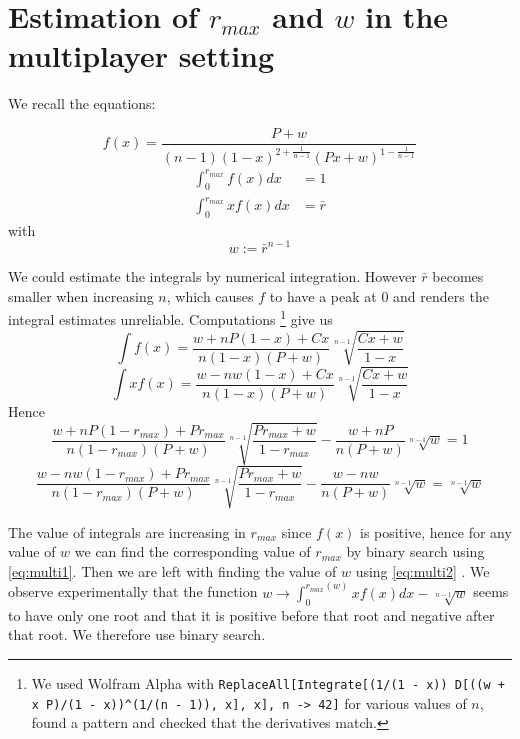 \documentclass[preprint,12pt,authoryear]{elsarticle}
\theoremstyle{definition}
\begin{document}
\section{\texorpdfstring{Estimation of ${r_{max}}$ and $w$ in the multiplayer setting}{Estimation of rmax and w in the multiplayer setting}}
\label{estimate}

We recall the equations:

$$f(x) = \frac{P+ w}{(n-1)(1-x)^{2+\frac{1}{n-1}} (Px + w)^{1 - \frac{1}{n-1}}}$$
\begin{align*}
        \int_0^{r_{max}} f(x) dx &= 1 \\
        \int_0^{r_{max}} x f(x) dx &= \bar r 
\end{align*}
with $$w := \bar r ^ {n-1}$$

We could estimate the integrals by numerical integration. However $\bar r$ becomes smaller when increasing $n$, which causes $f$ to have a peak at $0$ and renders the integral estimates unreliable.
Computations \footnote{We used Wolfram Alpha with \texttt{ReplaceAll[Integrate[(1/(1 - x)) D[((w + x P)/(1 - x))\^{}(1/(n - 1)), x], x], {n -> 42}]} for various values of $n$, found a pattern and checked that the derivatives match.} give us 
$$\int f(x) = \frac{w + nP(1-x) + Cx}{n (1 - x)(P+w)} \sqrt[n-1]{\frac{Cx + w}{1-x}}$$
$$\int x f(x) = \frac{w - n w  (1-x) + Cx}{n (1-x)(P+w)}\sqrt[n-1]{\frac{Cx+w}{1-x}}$$
Hence
\begin{equation}
\label{eq:multi1}
\frac{w + nP(1-{r_{max}}) + P{r_{max}}}{n (1 - {r_{max}})(P+w)} \sqrt[n-1]{\frac{P{r_{max}} + w}{1-{r_{max}}}} -  \frac{w + nP}{n (P+w)} \sqrt[n-1]{w} = 1
\end{equation}
\begin{equation}
\label{eq:multi2}
\frac{w - n w  (1-{r_{max}}) + P{r_{max}}}{n (1-{r_{max}})(P+w)}\sqrt[n-1]{\frac{P{r_{max}}+w}{1-{r_{max}}}} - \frac{w - n w}{n (P+w)}\sqrt[n-1]{w} = \sqrt[n-1]{w}
\end{equation}

The value of integrals are increasing in ${r_{max}}$ since $f(x)$ is positive, hence for any value of $w$ we can find the corresponding value of ${r_{max}}$ by binary search using \eqref{eq:multi1}. Then we are left with finding the value of $w$ using \eqref{eq:multi2} . We observe experimentally that the function $w \rightarrow \int_0^{{r_{max}}(w)}xf(x)dx - \sqrt[n-1]{w}$ seems to have only one root and that it is positive before that root and negative after that root. We therefore use binary search.
\end{document}
